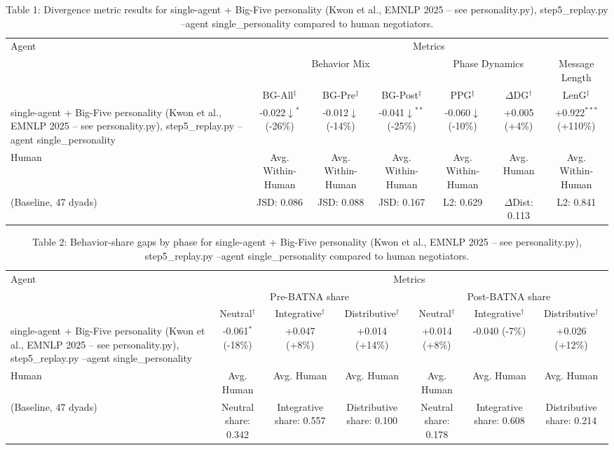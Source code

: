 \begin{table}[t]
\centering
\begin{tabular}{lcccccc}
\toprule
\multirow{3}{*}{Agent} & \multicolumn{6}{c}{Metrics} \\
\cmidrule(lr){2-7}
 & \multicolumn{3}{c}{Behavior Mix} & \multicolumn{2}{c}{Phase Dynamics} & \multicolumn{1}{c}{Message Length} \\
\cmidrule(lr){2-4} \cmidrule(lr){5-6} \cmidrule(lr){7-7}
 & BG-All$^\ddagger$ & BG-Pre$^\ddagger$ & BG-Post$^\ddagger$ & PPG$^\ddagger$ & $\Delta$DG$^\dagger$ & LenG$^\ddagger$ \\
\midrule
single-agent + Big-Five personality (Kwon et al., EMNLP 2025 -- see personality.py), step5_replay.py --agent single_personality & -0.022$\downarrow$$^{*}$ (-26\%) & -0.012$\downarrow$ (-14\%) & -0.041$\downarrow$$^{**}$ (-25\%) & -0.060$\downarrow$ (-10\%) & +0.005 (+4\%) & +0.922$^{***}$ (+110\%) \\
\midrule
Human & Avg. Within-Human & Avg. Within-Human & Avg. Within-Human & Avg. Within-Human & Avg. Human & Avg. Within-Human \\
(Baseline, 47 dyads) & JSD: 0.086 & JSD: 0.088 & JSD: 0.167 & L2: 0.629 & $\Delta$Dist: 0.113 & L2: 0.841 \\
\bottomrule
\end{tabular}
\caption{Table 1: Divergence metric results for single-agent + Big-Five personality (Kwon et al., EMNLP 2025 -- see personality.py), step5_replay.py --agent single_personality compared to human negotiators.}
\end{table}

\begin{table}[t]
\centering
\begin{tabular}{lcccccc}
\toprule
\multirow{3}{*}{Agent} & \multicolumn{6}{c}{Metrics} \\
\cmidrule(lr){2-7}
 & \multicolumn{3}{c}{Pre-BATNA share} & \multicolumn{3}{c}{Post-BATNA share} \\
\cmidrule(lr){2-4} \cmidrule(lr){5-7}
 & Neutral$^\dagger$ & Integrative$^\dagger$ & Distributive$^\dagger$ & Neutral$^\dagger$ & Integrative$^\dagger$ & Distributive$^\dagger$ \\
\midrule
single-agent + Big-Five personality (Kwon et al., EMNLP 2025 -- see personality.py), step5_replay.py --agent single_personality & -0.061$^{*}$ (-18\%) & +0.047 (+8\%) & +0.014 (+14\%) & +0.014 (+8\%) & -0.040 (-7\%) & +0.026 (+12\%) \\
\midrule
Human & Avg. Human & Avg. Human & Avg. Human & Avg. Human & Avg. Human & Avg. Human \\
(Baseline, 47 dyads) & Neutral share: 0.342 & Integrative share: 0.557 & Distributive share: 0.100 & Neutral share: 0.178 & Integrative share: 0.608 & Distributive share: 0.214 \\
\bottomrule
\end{tabular}
\caption{Table 2: Behavior-share gaps by phase for single-agent + Big-Five personality (Kwon et al., EMNLP 2025 -- see personality.py), step5_replay.py --agent single_personality compared to human negotiators.}
\end{table}

